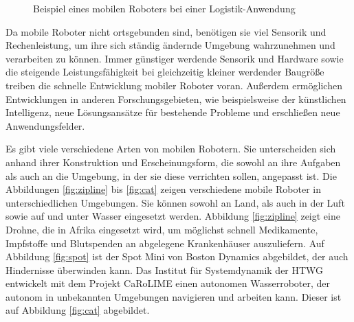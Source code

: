 {\begin{figure}[htb]
\begin{minipage}[t]{0.3\linewidth}
		\caption[Beispiel eines mobilen Roboters bei einer Logistik-Anwendung]{Beispiel eines mobilen Roboters bei einer Logistik-Anwendung\footnotemark}
		\label{fig:logistik}
	\end{minipage}
\end{figure}
\addtocounter{footnote}{-3}
}

Da mobile Roboter nicht ortsgebunden sind, benötigen sie viel Sensorik und Rechenleistung, um ihre sich ständig ändernde Umgebung wahrzunehmen und verarbeiten zu können. Immer günstiger werdende Sensorik und Hardware sowie die steigende Leistungsfähigkeit bei gleichzeitig kleiner werdender Baugröße treiben die schnelle \linebreak Entwicklung mobiler Roboter voran. Außerdem ermöglichen Entwicklungen in anderen Forschungsgebieten, wie beispielsweise der künstlichen Intelligenz, neue Lösungsansätze für bestehende Probleme und erschließen neue Anwendungsfelder. 

Es gibt viele verschiedene Arten von mobilen Robotern. Sie unterscheiden sich anhand ihrer Konstruktion und Erscheinungsform, die sowohl an ihre Aufgaben als auch an die Umgebung, in der sie diese verrichten sollen, angepasst ist. Die Abbildungen \ref{fig:zipline} bis \ref{fig:cat} zeigen verschiedene mobile Roboter in unterschiedlichen Umgebungen. Sie können sowohl an Land, als auch in der Luft sowie auf und unter Wasser eingesetzt werden. Abbildung \ref{fig:zipline} zeigt eine Drohne, die in Afrika eingesetzt wird, um möglichst schnell Medikamente, Impfstoffe und Blutspenden an abgelegene Krankenhäuser auszuliefern. Auf Abbildung \ref{fig:spot} ist der Spot Mini von Boston Dynamics abgebildet, der auch Hindernisse überwinden kann. Das Institut für Systemdynamik der HTWG entwickelt mit dem Projekt CaRoLIME einen autonomen Wasserroboter, der autonom in unbekannten Umgebungen navigieren und arbeiten kann. Dieser ist auf Abbildung \ref{fig:cat} abgebildet. 

